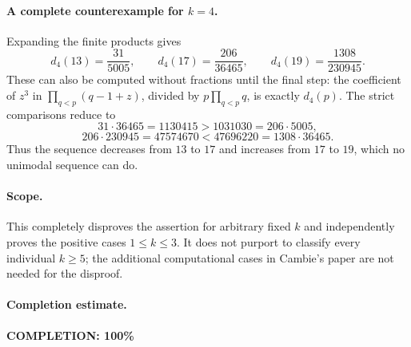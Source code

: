 \paragraph{A complete counterexample for \(k=4\).}
Expanding the finite products gives
\[
 d_4(13)=\frac{31}{5005},\qquad
 d_4(17)=\frac{206}{36465},\qquad
 d_4(19)=\frac{1308}{230945}.
\]
These can also be computed without fractions until the final step:
the coefficient of \(z^3\) in
\(\prod_{q<p}(q-1+z)\), divided by \(p\prod_{q<p}q\),
is exactly \(d_4(p)\).
The strict comparisons reduce to
\[
 31\cdot36465=1130415>1031030=206\cdot5005,
\]
\[
 206\cdot230945=47574670<47696220=1308\cdot36465.
\]
Thus the sequence decreases from \(13\) to \(17\) and increases
from \(17\) to \(19\), which no unimodal sequence can do.

\paragraph{Scope.}
This completely disproves the assertion for arbitrary fixed \(k\)
and independently proves the positive cases \(1\leq k\leq3\).
It does not purport to classify every individual \(k\geq5\);
the additional computational cases in Cambie's paper are not needed
for the disproof.

\paragraph{Completion estimate.}
\textbf{COMPLETION: 100\%}
